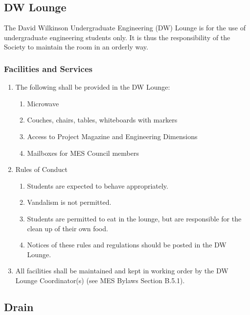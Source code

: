 \hypertarget{dw-lounge}{%
 \subsection{DW Lounge}
 \label{dw-lounge}}
The David Wilkinson Undergraduate Engineering (DW) Lounge is for the use
of undergraduate engineering students only. It is thus the
responsibility of the Society to maintain the room in an orderly way.

\hypertarget{facilities-and-services}{%
 \subsubsection{Facilities and Services}
 \label{facilities-and-services}}

\begin{enumerate}
 \item
  The following shall be provided in the DW Lounge:

  \begin{enumerate}
   \item
    Microwave
   \item
    Couches, chairs, tables, whiteboards with markers
   \item
    Access to Project Magazine and Engineering Dimensions
   \item
    Mailboxes for MES Council members
  \end{enumerate}
 \item
  Rules of Conduct

  \begin{enumerate}
   \item
    Students are expected to behave appropriately.
   \item
    Vandalism is not permitted.
   \item
    Students are permitted to eat in the lounge, but are responsible for
    the clean up of their own food.
   \item
    Notices of these rules and regulations should be posted in the DW
    Lounge.
  \end{enumerate}
 \item
  All facilities shall be maintained and kept in working order by the DW
  Lounge Coordinator(s) (see MES Bylaws Section B.5.1).
\end{enumerate}
\hypertarget{drain}{%
 \subsection{Drain}
 \label{drain}}

